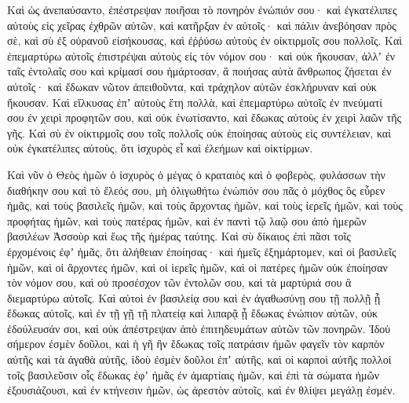 {\par }{\PP {}Καὶ ὡς ἀνεπαύσαντο, ἐπέστρεψαν ποιῆσαι τὸ πονηρὸν ἐνώπιόν σου· καὶ ἐγκατέλιπες αὐτοὺς εἰς χεῖρας ἐχθρῶν αὐτῶν, καὶ κατῆρξαν ἐν αὐτοῖς· καὶ πάλιν ἀνεβόησαν πρὸς σὲ, καὶ σὺ ἐξ οὐρανοῦ εἰσήκουσας, καὶ ἐῤῥύσω αὐτοὺς ἐν οἰκτιρμοῖς σου πολλοῖς.
Καὶ ἐπεμαρτύρω αὐτοῖς ἐπιστρέψαι αὐτοὺς εἰς τὸν νόμον σου· καὶ οὐκ ἤκουσαν, ἀλλʼ ἐν ταῖς ἐντολαῖς σου καὶ κρίμασί σου ἡμάρτοσαν, ἃ ποιήσας αὐτὰ ἄνθρωπος ζήσεται ἐν αὐτοῖς· καὶ ἔδωκαν νῶτον ἀπειθοῦντα, καὶ τράχηλον αὐτῶν ἐσκλήρυναν καὶ οὐκ ἤκουσαν.
Καὶ εἵλκυσας ἐπʼ αὐτοὺς ἔτη πολλὰ, καὶ ἐπεμαρτύρω αὐτοῖς ἐν πνεύματί σου ἐν χειρὶ προφητῶν σου, καὶ οὐκ ἐνωτίσαντο, καὶ ἔδωκας αὐτοὺς ἐν χειρὶ λαῶν τῆς γῆς.
Καὶ σὺ ἐν οἰκτιρμοῖς σου τοῖς πολλοῖς οὐκ ἐποίησας αὐτοὺς εἰς συντέλειαν, καὶ οὐκ ἐγκατέλιπες αὐτοὺς, ὅτι ἰσχυρὸς εἶ καὶ ἐλεήμων καὶ οἰκτίρμων.
\par }{\PP {}Καὶ νῦν ὁ Θεὸς ἡμῶν ὁ ἰσχυρὸς ὁ μέγας ὁ κραταιὸς καὶ ὁ φοβερὸς, φυλάσσων τὴν διαθήκην σου καὶ τὸ ἔλεός σου, μὴ ὀλιγωθήτω ἐνώπιόν σου πᾶς ὁ μόχθος ὃς εὗρεν ἡμᾶς, καὶ τοὺς βασιλεῖς ἡμῶν, καὶ τοὺς ἄρχοντας ἡμῶν, καὶ τοὺς ἱερεῖς ἡμῶν, καὶ τοὺς προφήτας ἡμῶν, καὶ τοὺς πατέρας ἡμῶν, καὶ ἐν παντὶ τῷ λαῷ σου ἀπὸ ἡμερῶν βασιλέων Ἀσσοὺρ καὶ ἕως τῆς ἡμέρας ταύτης.
Καὶ σὺ δίκαιος ἐπὶ πᾶσι τοῖς ἐρχομένοις ἐφʼ ἡμᾶς, ὅτι ἀλήθειαν ἐποίησας· καὶ ἡμεῖς ἐξημάρτομεν,
καὶ οἱ βασιλεῖς ἡμῶν, καὶ οἱ ἄρχοντες ἡμῶν, καὶ οἱ ἱερεῖς ἡμῶν, καὶ οἱ πατέρες ἡμῶν οὐκ ἐποίησαν τὸν νόμον σου, καὶ οὐ προσέσχον τῶν ἐντολῶν σου, καὶ τὰ μαρτύριά σου ἃ διεμαρτύρω αὐτοῖς.
Καὶ αὐτοὶ ἐν βασιλείᾳ σου καὶ ἐν ἀγαθωσύνῃ σου τῇ πολλῇ ᾗ ἔδωκας αὐτοῖς, καὶ ἐν τῇ γῇ τῇ πλατείᾳ καὶ λιπαρᾷ ᾗ ἔδωκας ἐνώπιον αὐτῶν, οὐκ ἐδούλευσάν σοι, καὶ οὐκ ἀπέστρεψαν ἀπὸ ἐπιτηδευμάτων αὐτῶν τῶν πονηρῶν.
Ἰδοὺ σήμερον ἐσμὲν δοῦλοι, καὶ ἡ γῆ ἣν ἔδωκας τοῖς πατράσιν ἡμῶν φαγεῖν τὸν καρπὸν αὐτῆς καὶ τὰ ἀγαθὰ αὐτῆς, ἰδοὺ ἐσμὲν δοῦλοι ἐπʼ αὐτῆς, καὶ οἱ καρποὶ αὐτῆς πολλοὶ
τοῖς βασιλεῦσιν οἷς ἔδωκας ἐφʼ ἡμᾶς ἐν ἁμαρτίαις ἡμῶν, καὶ ἐπὶ τὰ σώματα ἡμῶν ἐξουσιάζουσι, καὶ ἐν κτήνεσιν ἡμῶν, ὡς ἀρεστὸν αὐτοῖς, καὶ ἐν θλίψει μεγάλῃ ἐσμέν.

}

